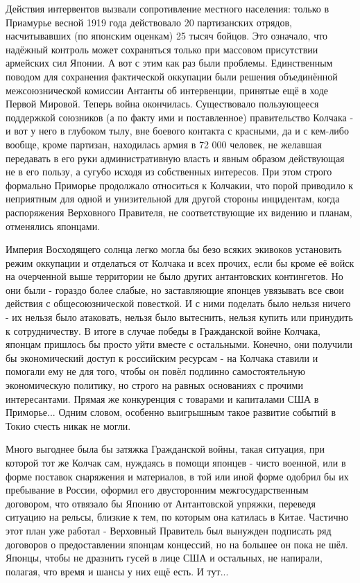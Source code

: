Действия интервентов вызвали сопротивление местного населения: только в Приамурье весной 1919 года действовало 20 партизанских отрядов, насчитывавших (по японским оценкам) 25 тысяч бойцов. Это означало, что надёжный контроль может сохраняться только при массовом присутствии армейских сил Японии. А вот с этим как раз были проблемы. Единственным поводом для сохранения фактической оккупации были решения объединённой межсоюзнической комиссии Антанты об интервенции, принятые ещё в ходе Первой Мировой. Теперь война окончилась. Существовало пользующееся поддержкой союзников (а по факту ими и поставленное) правительство Колчака - и вот у него в глубоком тылу, вне боевого контакта с красными, да и с кем-либо вообще, кроме партизан, находилась армия в 72 000 человек, не желавшая передавать в его руки административную власть и явным образом действующая не в его пользу, а сугубо исходя из собственных интересов. При этом строго формально Приморье продолжало относиться к Колчакии, что порой приводило к неприятным для одной и унизительной для другой стороны инцидентам, когда распоряжения Верховного Правителя, не соответствующие их видению и планам, отменялись японцами.

Империя Восходящего солнца легко могла бы безо всяких экивоков установить режим оккупации и отделаться от Колчака и всех прочих, если бы кроме её войск на очерченной выше территории не было других антантовских контингетов. Но они были - гораздо более слабые, но заставляющие японцев увязывать все свои действия с общесоюзнической повесткой. И с ними поделать было нельзя ничего - их нельзя было атаковать, нельзя было вытеснить, нельзя купить или принудить к сотрудничеству. В итоге в случае победы в Гражданской войне Колчака, японцам пришлось бы просто уйти вместе с остальными. Конечно, они получили бы экономический доступ к российским ресурсам - на Колчака ставили и помогали ему не для того, чтобы он повёл подлинно самостоятельную экономическую политику, но строго на равных основаниях с прочими интересантами. Прямая же конкуренция с товарами и капиталами США в Приморье... Одним словом, особенно выигрышным такое развитие событий в Токио счесть никак не могли.

Много выгоднее была бы затяжка Гражданской войны, такая ситуация, при которой тот же Колчак сам, нуждаясь в помощи японцев - чисто военной, или в форме поставок снаряжения и материалов, в той или иной форме одобрил бы их пребывание в России, оформил его двусторонним межгосударственным договором, что отвязало бы Японию от Антантовской упряжки, переведя ситуацию на рельсы, близкие к тем, по которым она катилась в Китае. Частично этот план уже работал - Верховный Правитель был вынужден подписать ряд договоров о предоставлении японцам концессий, но на большее он пока не шёл. Японцы, чтобы не дразнить гусей в лице США и остальных, не напирали, полагая, что время и шансы у них ещё есть. И тут...

